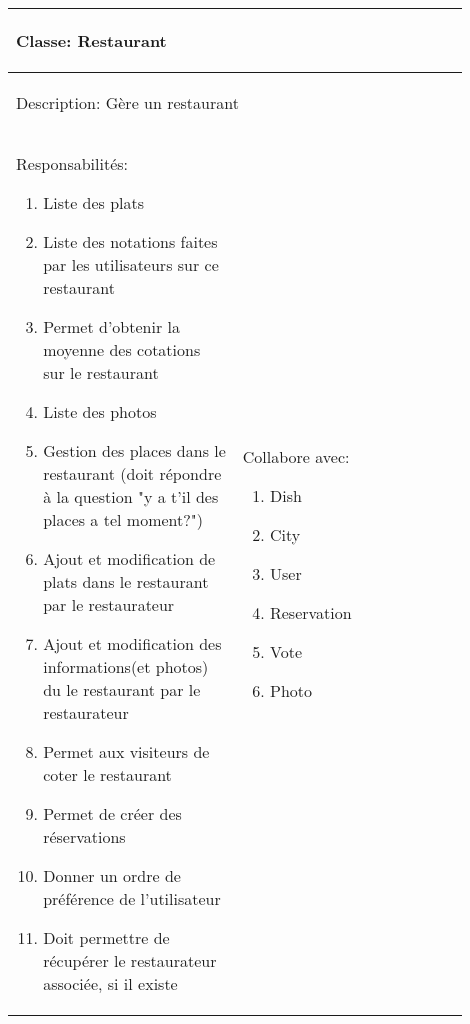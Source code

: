 \documentclass[10pt,a4paper]{article}
\begin{document}
\begin{tabular}{|p{0.45\linewidth}|p{0.45\linewidth}|}
  \hline
  \multicolumn{2}{|l|}{\begin{large}
  	Classe: Restaurant
  \end{large}}\\
  \hline
  \multicolumn{2}{|l|}{\begin{normalsize}
  	Description: Gère un restaurant
  \end{normalsize}}\\[0.05\linewidth]
  \hline
  \begin{normalsize}
  	Responsabilités:
  	\begin{enumerate}
  		\item Liste des plats
  		\item Liste des notations faites par les utilisateurs sur ce restaurant
  		\item Permet d'obtenir la moyenne des cotations sur le restaurant
  		\item Liste des photos
  		\item Gestion des places dans le restaurant (doit répondre à la question "y a t'il des places a tel moment?")
  		\item Ajout et modification de plats dans le restaurant par le restaurateur
  		\item Ajout et modification des informations(et photos) du le restaurant par le restaurateur
  		\item Permet aux visiteurs de coter le restaurant
  		\item Permet de créer des réservations
  		\item Donner un ordre de préférence de l'utilisateur
  		\item Doit permettre de récupérer le restaurateur associée, si il existe
  	\end{enumerate}
  \end{normalsize} & 
  \begin{normalsize}{
  	Collabore avec:
  	\begin{enumerate}
  		\item Dish
    		\item City
    		\item User
    		\item Reservation
    		\item Vote
    		\item Photo
  	\end{enumerate}
  }\end{normalsize}\\[0.6\linewidth]
  \hline
\end{tabular}
\end{document}
